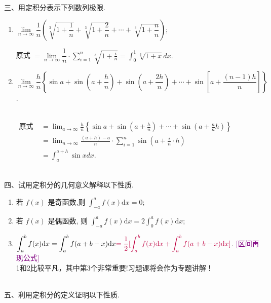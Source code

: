 \documentclass[lang=cn,newtx,10pt,scheme=chinese]{elegantbook}
\begin{document}
~\\
三、用定积分表示下列数列极限.\\
\begin{enumerate}
	\item $\lim\limits _{n \rightarrow \infty} \dfrac{1}{n}\left(\sqrt[3]{1+\dfrac{1}{n}}+\sqrt[3]{1+\dfrac{2}{n}}+\cdots+\sqrt[3]{1+\dfrac{n}{n}}\right)$;
\begin{solution}
	原式 $=\lim\limits _{n \rightarrow \infty} \dfrac{1}{n} \cdot \displaystyle\sum_{i=1}^n \sqrt[3]{1+\frac{i}{n}}=\int_0^1 \sqrt[3]{1+x} d x.
	$
\end{solution}
	\item $\lim\limits _{n \rightarrow \infty} \dfrac{h}{n}\left\{\sin a+\sin \left(a+\dfrac{h}{n}\right)+\sin \left(a+\dfrac{2 h}{n}\right)+\cdots+\sin \left[a+\dfrac{(n-1) h}{n}\right]\right\}$.
	\begin{solution}\\
		$
		\begin{aligned}
			\text{原式 }& =\lim _{a \rightarrow \infty} \frac{h}{n}\left\{\sin a+\sin \left(a+\frac{h}{n}\right)+\cdots+\sin \left(a+\frac{n}{n} h\right)\right\} \\
			& =\lim _{n \rightarrow \infty} \frac{(a+h)-a}{n} \cdot \sum_{i=1}^n \sin \left(a+\frac{i}{n} \cdot h\right) \\
			& =\int_a^{a+h} \sin x d x.
		\end{aligned}
		$
	\end{solution}
\end{enumerate}

~\\
四、试用定积分的几何意义解释以下性质.\\
\begin{enumerate}
	\item 若 $f(x)$ 是奇函数,则 $\displaystyle\int_{-a}^a f(x) \mathrm{d} x=0$;
	\item 若 $f(x)$ 是偶函数, 则 $\displaystyle\int_{-a}^a f(x) \mathrm{d} x=2 \displaystyle\int_0^a f(x) \mathrm{d} x$;
	\item  $\displaystyle\int_a^b f(x) \mathrm{d} x=\int_a^b f(a+b-x) \mathrm{d} x{\color{purple} =\dfrac{1}{2}[\displaystyle\int_a^b f(x) \mathrm{d} x+\int_a^b f(a+b-x) \mathrm{d} x]}$. \quad\textcolor{purple}{[区间再现公式]}\\
{\color{purple}1和2比较平凡，其中第3个非常重要!习题课将会作为专题讲解！}
\end{enumerate}


\newpage
~\\
五、利用定积分的定义证明以下性质.\\
\end{document}
